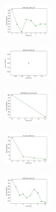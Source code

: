 \begin{figure}[H]
    \begin{subfigure}
        \centering
        \includegraphics[width=0.234\textwidth]{img/copkm/ecoli_set_const_20_589741062_cost.png}
    \end{subfigure}
    \hfill
    \begin{subfigure}
        \centering
        \includegraphics[width=0.234\textwidth]{img/copkm/rand_set_const_20_589741062_cost.png}
    \end{subfigure}
    \hfill
    \begin{subfigure}
        \centering
        \includegraphics[width=0.234\textwidth]{img/copkm/newthyroid_set_const_20_589741062_cost.png}
    \end{subfigure}
    \hfill
    \begin{subfigure}
        \centering
        \includegraphics[width=0.234\textwidth]{img/copkm/iris_set_const_20_277451237_cost.png}
    \end{subfigure}
    \hfill
    \begin{subfigure}
        \centering
        \includegraphics[width=0.234\textwidth]{img/copkm/ecoli_set_const_20_277451237_cost.png}
    \end{subfigure}
    \hfill
    \begin{subfigure}
        \centering

\end{subfigure}
\end{figure}
